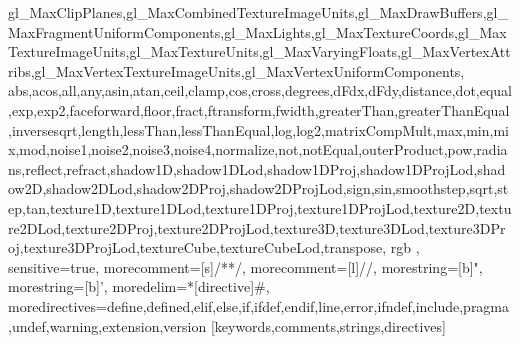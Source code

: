 {{	%
		gl_MaxClipPlanes,gl_MaxCombinedTextureImageUnits,gl_MaxDrawBuffers,gl_MaxFragmentUniformComponents,gl_MaxLights,gl_MaxTextureCoords,gl_MaxTextureImageUnits,gl_MaxTextureUnits,gl_MaxVaryingFloats,gl_MaxVertexAttribs,gl_MaxVertexTextureImageUnits,gl_MaxVertexUniformComponents,%
		abs,acos,all,any,asin,atan,ceil,clamp,cos,cross,degrees,dFdx,dFdy,distance,dot,equal,exp,exp2,faceforward,floor,fract,ftransform,fwidth,greaterThan,greaterThanEqual,inversesqrt,length,lessThan,lessThanEqual,log,log2,matrixCompMult,max,min,mix,mod,noise1,noise2,noise3,noise4,normalize,not,notEqual,outerProduct,pow,radians,reflect,refract,shadow1D,shadow1DLod,shadow1DProj,shadow1DProjLod,shadow2D,shadow2DLod,shadow2DProj,shadow2DProjLod,sign,sin,smoothstep,sqrt,step,tan,texture1D,texture1DLod,texture1DProj,texture1DProjLod,texture2D,texture2DLod,texture2DProj,texture2DProjLod,texture3D,texture3DLod,texture3DProj,texture3DProjLod,textureCube,textureCubeLod,transpose,%
		rgb
	},
	sensitive=true,%
	morecomment=[s]{/*}{*/},%
	morecomment=[l]//,%
	morestring=[b]",%
	morestring=[b]',%
	moredelim=*[directive]\#,%
	moredirectives={define,defined,elif,else,if,ifdef,endif,line,error,ifndef,include,pragma,undef,warning,extension,version}%
}[keywords,comments,strings,directives]%

